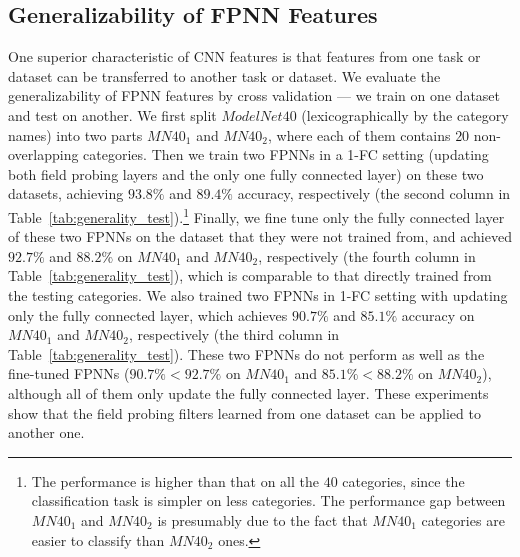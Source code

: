 \subsection{Generalizability of FPNN Features}
\begin{table}
\vspace{-2.1cm}
\begin{center}
\end{center}
\vspace{-0.3cm}
\caption{Generalizability test of FPNN features.}
\label{tab:generality_test}
\vspace{-0.4cm}
\end{table}
One superior characteristic of CNN features is that features from one task or dataset can be transferred to another task or dataset. We evaluate the generalizability of FPNN features by cross validation --- we train on one dataset and test on another. We first split ${ModelNet40}$ (lexicographically by the category names) into two parts ${MN40}_1$ and ${MN40}_2$, where each of them contains $20$ non-overlapping categories. Then we train two FPNNs in a 1-FC setting (updating both field probing layers and the only one fully connected layer) on these two datasets, achieving $93.8\%$ and $89.4\%$ accuracy, respectively (the second column in Table~\ref{tab:generality_test}).\footnote{The performance is higher than that on all the $40$ categories, since the classification task is simpler on less categories. The performance gap between ${MN40}_1$ and ${MN40}_2$ is presumably due to the fact that ${MN40}_1$ categories are easier to classify than ${MN40}_2$ ones.} Finally, we fine tune only the fully connected layer of these two FPNNs on the dataset that they were not trained from, and achieved $92.7\%$ and $88.2\%$ on ${MN40}_1$ and ${MN40}_2$, respectively (the fourth column in Table~\ref{tab:generality_test}), which is comparable to that directly trained from the testing categories. We also trained two FPNNs in 1-FC setting with updating only the fully connected layer, which achieves $90.7\%$ and $85.1\%$ accuracy on ${MN40}_1$ and ${MN40}_2$, respectively (the third column in Table~\ref{tab:generality_test}). These two FPNNs do not perform as well as the fine-tuned FPNNs ($90.7\% < 92.7\%$ on ${MN40}_1$ and $85.1\% < 88.2\%$ on ${MN40}_2$), although all of them only update the fully connected layer. These experiments show that the field probing filters learned from one dataset can be applied to another one. 

